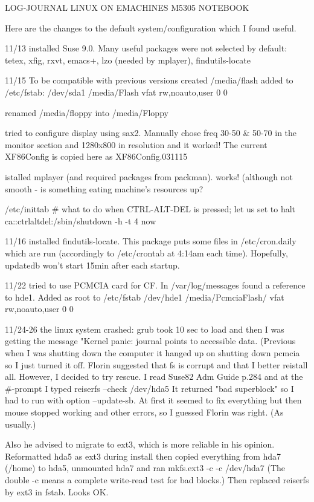 LOG-JOURNAL
LINUX ON EMACHINES M5305 NOTEBOOK

Here are the changes to the default system/configuration which I found
useful.


11/13
installed Suse 9.0. Many useful packages were not selected by default:
tetex, xfig, rxvt, emacs+, lzo (needed by mplayer), findutils-locate


11/15
To be compatible with previous versions created /media/flash 
added to 
/etc/fstab:
/dev/sda1            /media/Flash         vfat       rw,noauto,user        0 0

renamed /media/floppy into /media/Floppy

tried to configure display using sax2. Manually chose freq 30-50 & 50-70 in
the monitor section and 1280x800 in resolution and it worked! The current
XF86Config is copied here as XF86Config.031115

istalled mplayer (and required packages from packman). works! (although
not smooth - is something eating machine's resources up?

/etc/inittab
# what to do when CTRL-ALT-DEL is pressed; let us set to halt
ca::ctrlaltdel:/sbin/shutdown -h -t 4 now

11/16
 installed findutils-locate. This package puts some files in /etc/cron.daily
which are run (accordingly to /etc/crontab at 4:14am each time). Hopefully,
updatedb won't start 15min after each startup.


11/22
 tried to use PCMCIA card for CF. In /var/log/messages found a reference to
hde1. Added as root to /etc/fstab
/dev/hde1            /media/PcmciaFlash/  vfat       rw,noauto,user        0 0


11/24-26
the linux system crashed: grub took 10 sec to load and then I was getting
the message "Kernel panic: journal points to accessible data. (Previous when I
was shutting down the computer it hanged up on shutting down pcmcia so I just
turned it off. Florin suggested that fs is corrupt and that I better reistall
all. However, I decided to try rescue. I read Suse82 Adm Guide p.284 and
at the #-prompt I typed
 reiserfs --check /dev/hda5
 It returned "bad superblock" so I had to run with option --update-sb. At
first it seemed to fix everything but then mouse stopped working and other
errors, so I guessed Florin was right. (As usually.)

Also he advised to migrate to ext3, which is more reliable in his
opinion. Reformatted hda5 as ext3 during install then copied everything from
hda7 (/home) to hda5, unmounted hda7 and ran 
 mkfs.ext3 -c -c /dev/hda7
 (The double -c means a complete write-read test for bad blocks.) Then
replaced reiserfs by ext3 in fstab. Looks OK.

